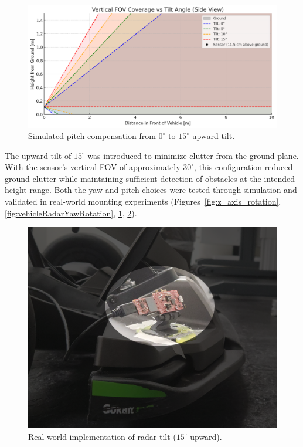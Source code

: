 \begin{figure}[!htbp]
    \centering
    \includegraphics[width=0.8\linewidth]{images/TiltSensor.png}
    \caption{Simulated pitch compensation from $0^\circ$ to $15^\circ$ upward tilt.}
    \label{fig:x_axis_rotation}
\end{figure}

The upward tilt of $15^\circ$ was introduced to minimize clutter from the ground plane.  
With the sensor's vertical FOV of approximately $30^\circ$, this configuration reduced ground clutter while maintaining sufficient detection of obstacles at the intended height range.  
Both the yaw and pitch choices were tested through simulation and validated in real-world mounting experiments (Figures~\ref{fig:z_axis_rotation}, \ref{fig:vehicleRadarYawRotation}, \ref{fig:x_axis_rotation}, \ref{fig:vehicleYawTilt}).

\begin{figure}[!htbp]
    \centering
    \includegraphics[width=0.8\linewidth]{images/vehicleRadarTiltRotation.png}
    \caption{Real-world implementation of radar tilt ($15^\circ$ upward).}
    \label{fig:vehicleYawTilt}
\end{figure}

